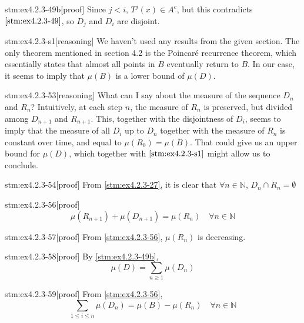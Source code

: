 \begin{stm}{stm:ex4.2.3-49b}[proof]
Since $j < i$, $T^j(x) \in A^c$, but this contradicts $\ref{stm:ex4.2.3-49}$, so $D_j$ and $D_i$ are disjoint.
\end{stm}

\begin{stm}{stm:ex4.2.3-s1}[reasoning]
We haven't used any results from the given section. The only theorem mentioned in section 4.2 is the Poincaré recurrence theorem, which essentially states that almost all points in $B$ eventually return to $B$. In our case, it seems to imply that $\mu(B)$ is a lower bound of $\mu(D)$. 
\end{stm}

\begin{stm}{stm:ex4.2.3-53}[reasoning]
What can I say about the measure of the sequence $D_n$ and $R_n$? Intuitively, at each step $n$, the measure of $R_n$ is preserved, but divided among $D_{n+1}$ and $R_{n+1}$. This, together with the disjointness of $D_i$, seems to imply that the measure of all $D_i$ up to $D_n$ together with the measure of $R_n$ is constant over time, and equal to $\mu(R_0) = \mu(B)$. That could give us an upper bound for $\mu(D)$, which together with $\ref{stm:ex4.2.3-s1}$ might allow us to conclude.
\end{stm}

\begin{stm}{stm:ex4.2.3-54}[proof]
From \ref{stm:ex4.2.3-27}, it is clear that $\forall n \in \mathbb{N}$, $D_n \cap R_n = \emptyset$
\end{stm}

\begin{stm}{stm:ex4.2.3-56}[proof]
\[
\mu(R_{n+1}) + \mu(D_{n+1}) = \mu(R_n) \quad \forall n \in \mathbb{N}
\]
\end{stm}

\begin{stm}{stm:ex4.2.3-57}[proof]
From \ref{stm:ex4.2.3-56}, $\mu(R_n)$ is decreasing.
\end{stm}

\begin{stm}{stm:ex4.2.3-58}[proof]
By \ref{stm:ex4.2.3-49b}, 
\[
\mu(D) = \sum_{n \ge 1} \mu(D_n)
\]
\end{stm}

\begin{stm}{stm:ex4.2.3-59}[proof]
From \ref{stm:ex4.2.3-56},
\[
\sum_{1 \le i \le n} \mu(D_n) = \mu(B) - \mu(R_n) \quad \forall n \in \mathbb{N}
\]
\end{stm}

